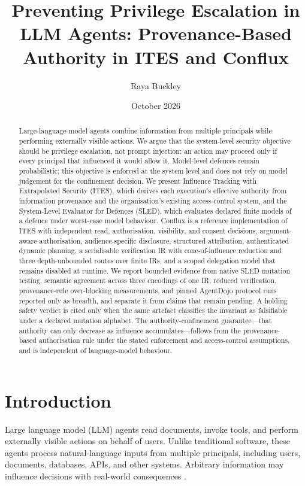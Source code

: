 \documentclass[11pt]{article}
\title{Preventing Privilege Escalation in LLM Agents: Provenance-Based Authority in ITES and Conflux}
\author{Raya Buckley}
\date{October 2026}
\begin{document}
\maketitle

\begin{abstract}
Large-language-model agents combine information from multiple principals
while performing externally visible actions. We argue that the system-level
security objective should be privilege escalation, not prompt injection: an
action may proceed only if every principal that influenced it would allow it.
Model-level defences remain probabilistic; this objective is enforced at the
system level and does not rely on model judgement for the confinement decision. We present Influence
Tracking with Extrapolated Security (ITES), which derives each execution's
effective authority from information provenance and the organisation's
existing access-control system, and the System-Level Evaluator for Defences
(SLED), which evaluates declared finite models of a defence under worst-case
model behaviour. Conflux is a reference implementation of ITES with
independent read, authorisation, visibility, and consent decisions,
argument-aware authorisation, audience-specific disclosure, structured
attribution, authenticated dynamic planning, a serialisable verification IR
with cone-of-influence reduction and three depth-unbounded routes over finite
IRs, and a scoped delegation model that remains disabled at runtime. We report
bounded evidence from native SLED mutation testing, semantic agreement across
three encodings of one IR, reduced verification, provenance-rule over-blocking
measurements, and pinned AgentDojo protocol runs reported only as breadth, and
separate it from claims that remain pending. A holding safety verdict is cited
only when the same artefact classifies the invariant as falsifiable under a
declared mutation alphabet. The authority-confinement guarantee---that
authority can only decrease as influence accumulates---follows from the
provenance-based authorisation rule under the stated enforcement and
access-control assumptions, and is independent of language-model behaviour.
\end{abstract}


\section{Introduction}

Large language model (LLM) agents read documents, invoke tools, and perform
externally visible actions on behalf of users. Unlike traditional software,
these agents process natural-language inputs from multiple principals,
including users, documents, databases, APIs, and other systems. Arbitrary
information may influence decisions with real-world consequences
\citep{earlycategorization}.
\end{document}
